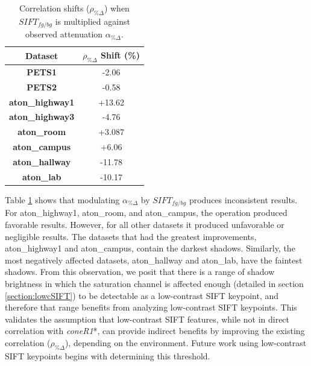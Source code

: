 \begin{table}
\centering
\begin{tabular}{ |c|c| }
	\hline
	\textbf{Dataset} & $\rho_{\%\Delta}$ Shift (\%)\\
	\hline
	\hline
	\textbf{PETS1} &  -2.06 \\
	\hline
	\textbf{PETS2} & -0.58 \\
	\hline
	\textbf{aton\_highway1} &  +13.62 \\
	\hline
	\textbf{aton\_highway3} & -4.76  \\
	\hline
	\textbf{aton\_room} & +3.087 \\
	\hline
	\textbf{aton\_campus} & +6.06 \\
	\hline
	\textbf{aton\_hallway} & -11.78 \\
	\hline
	\textbf{aton\_lab} & -10.17 \\
	\hline
\end{tabular}
\caption{Correlation shifts ($\rho_{\%\Delta}$) when $SIFT_{fg/bg}$ is multiplied against observed attenuation $\alpha_{\%\Delta}$.}
\label{table:corr_diff_sift}
\end{table}

Table \ref{table:corr_diff_sift} shows that modulating $\alpha_{\%\Delta}$ by $SIFT_{fg/bg}$ produces inconsistent results. For aton\_highway1, aton\_room, and aton\_campus, the operation produced favorable results. However, for all other datasets it produced unfavorable or negligible results. The datasets that had the greatest improvements, aton\_highway1 and aton\_campus, contain the darkest shadows. Similarly, the most negatively affected datasets, aton\_hallway and aton\_lab, have the faintest shadows. From this observation, we posit that there is a range of shadow brightness in which the saturation channel is affected enough (detailed in section \ref{section:lowcSIFT}) to be detectable as a low-contrast SIFT keypoint, and therefore that range benefits from analyzing low-contrast SIFT keypoints. This validates the assumption that low-contrast SIFT features, while not in direct correlation with \textit{coneR1}*, can provide indirect benefits by improving the existing correlation ($\rho_{\%\Delta}$), depending on the environment. Future work using low-contrast SIFT keypoints begins with determining this threshold.


